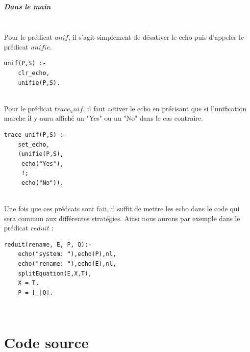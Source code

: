 \documentclass[10pt,a4paper]{report}
\begin{document}
\paragraph{Dans le main} ~\\
Pour le prédicat $unif$, il s'agit simplement de désativer le echo puis d'appeler le prédicat $unifie$.
\begin{lstlisting}[caption ={unif dans $main.pl$}]
unif(P,S) :-
	clr_echo,
	unifie(P,S).
\end{lstlisting} ~\\
Pour le prédicat $trace_unif$, il faut activer le echo en précisant que si l'unification marche il y aura affiché un "Yes" ou un "No" dans le cas contraire.
\begin{lstlisting}[caption ={trace unif dans $main.pl$}]
trace_unif(P,S) :-
	set_echo,
	(unifie(P,S),
	 echo("Yes"),
	 !;
	 echo("No")).
\end{lstlisting} ~\\
Une fois que ces prédcats sont fait, il suffit de mettre les echo dans le code qui sera commun aux différentes stratégies. Ainsi nous aurons par exemple dans le prédicat $reduit$ :
\begin{lstlisting}[caption ={Les echos dans $main.pl$}]
reduit(rename, E, P, Q):-
	echo("system: "),echo(P),nl,
	echo("rename: "),echo(E),nl,
	splitEquation(E,X,T),
	X = T,
	P = [_|Q].
\end{lstlisting} ~\\






\mbox{}
\newpage
\chapter*{Code source}
\end{document}

